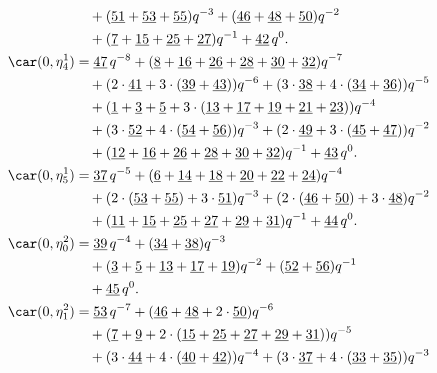 \begin{align*}
	&\quad+(\underline{51}+\underline{53}+\underline{55})q^{-3}+(\underline{46}+\underline{48}+\underline{50})q^{-2}\\
	&\quad+(\underline{7}+\underline{15}+\underline{25}+\underline{27})q^{-1}+\underline{42}\,q^0.\\
	\car(0,\eta^{1}_{4})
	&=\underline{47}\,q^{-8}+(\underline{8}+\underline{16}+\underline{26}+\underline{28}+\underline{30}+\underline{32})q^{-7}\\
	&\quad+(2\cdot\underline{41}+3\cdot(\underline{39}+\underline{43}))q^{-6}+(3\cdot\underline{38}+4\cdot(\underline{34}+\underline{36}))q^{-5}\\
	&\quad+(\underline{1}+\underline{3}+\underline{5}+3\cdot(\underline{13}+\underline{17}+\underline{19}+\underline{21}+\underline{23}))q^{-4}\\
	&\quad+(3\cdot\underline{52}+4\cdot(\underline{54}+\underline{56}))q^{-3}+(2\cdot\underline{49}+3\cdot(\underline{45}+\underline{47}))q^{-2}\\
	&\quad+(\underline{12}+\underline{16}+\underline{26}+\underline{28}+\underline{30}+\underline{32})q^{-1}+\underline{43}\,q^0.\\
	\car(0,\eta^{1}_{5})
	&=\underline{37}\,q^{-5}+(\underline{6}+\underline{14}+\underline{18}+\underline{20}+\underline{22}+\underline{24})q^{-4}\\
	&\quad+(2\cdot(\underline{53}+\underline{55})+3\cdot\underline{51})q^{-3}+(2\cdot(\underline{46}+\underline{50})+3\cdot\underline{48})q^{-2}\\
	&\quad+(\underline{11}+\underline{15}+\underline{25}+\underline{27}+\underline{29}+\underline{31})q^{-1}+\underline{44}\,q^0.\\
	\car(0,\eta^{2}_{0})
	&=\underline{39}\,q^{-4}+(\underline{34}+\underline{38})q^{-3}\\
	&\quad+(\underline{3}+\underline{5}+\underline{13}+\underline{17}+\underline{19})q^{-2}+(\underline{52}+\underline{56})q^{-1}\\
	&\quad+\underline{45}\,q^0.\\
	\car(0,\eta^{2}_{1})
	&=\underline{53}\,q^{-7}+(\underline{46}+\underline{48}+2\cdot\underline{50})q^{-6}\\
	&\quad+(\underline{7}+\underline{9}+2\cdot(\underline{15}+\underline{25}+\underline{27}+\underline{29}+\underline{31}))q^{-5}\\
	&\quad+(3\cdot\underline{44}+4\cdot(\underline{40}+\underline{42}))q^{-4}+(3\cdot\underline{37}+4\cdot(\underline{33}+\underline{35}))q^{-3}\\

\end{align*}

